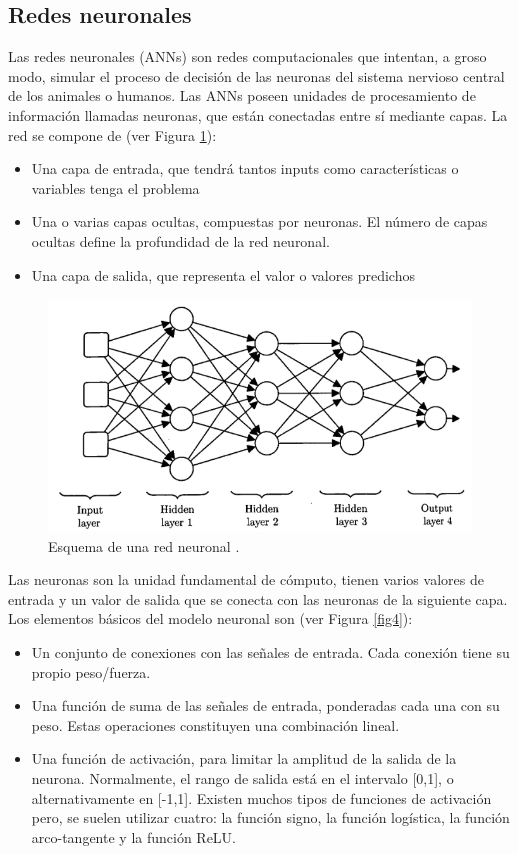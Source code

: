 \subsection{Redes neuronales}
Las redes neuronales (ANNs) \cite{24, 25, 27} son redes computacionales que intentan, a groso modo, simular el proceso de decisión de las neuronas del sistema nervioso central de los animales o humanos. Las ANNs poseen unidades de procesamiento de información llamadas neuronas, que están conectadas entre sí mediante capas. La red se compone de (ver Figura \ref{fig3}):
\begin{itemize}
	\item Una capa de entrada, que tendrá tantos inputs como características o variables tenga el problema
	\item Una o varias capas ocultas, compuestas por neuronas. El número de capas ocultas define la profundidad de la red neuronal.
	\item Una capa de salida, que representa el valor o valores predichos
\end{itemize} 

\begin{figure}[h]
	\centering
	\includegraphics[scale=0.5]{imagenes/cap2/neural-network.png}
	\caption{Esquema de una red neuronal \cite{26}.}
	\label{fig3}
\end{figure}

Las neuronas son la unidad fundamental de cómputo, tienen varios valores de entrada y un valor de salida que se conecta con las neuronas de la siguiente capa. Los elementos básicos del modelo neuronal son (ver Figura \ref{fig4}):

\begin{itemize}
	\item Un conjunto de conexiones con las señales de entrada. Cada conexión tiene su propio peso/fuerza.
	\item Una función de suma de las señales de entrada, ponderadas cada una con su peso. Estas operaciones constituyen una combinación lineal.
	\item Una función de activación, para limitar la amplitud de la salida de la neurona. Normalmente, el rango de salida está en el intervalo [0,1], o alternativamente en [-1,1]. Existen muchos tipos de funciones de activación pero, se suelen utilizar cuatro: la función signo, la función logística, la función arco-tangente y la función ReLU.
\end{itemize} 

